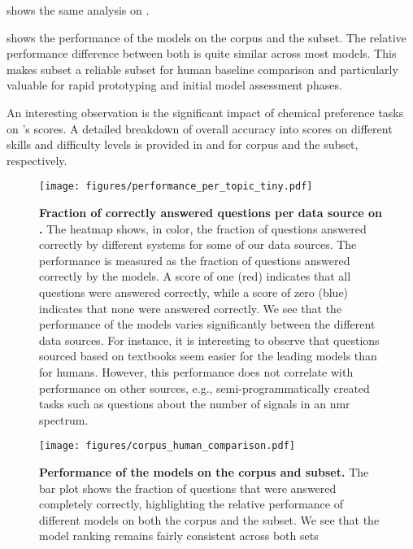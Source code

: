  shows the same analysis on \chembenchmini.

 shows the performance of the models on the \chembench corpus and the \chembenchmini subset. The relative performance difference between both is quite similar across most models. 
This makes \chembenchmini subset a reliable subset for human baseline comparison and particularly valuable for rapid prototyping and initial model assessment phases. 

An interesting observation is the significant impact of chemical preference tasks on \GPTFour's scores. A detailed breakdown of overall accuracy into scores on different skills and difficulty levels is provided in  and  for \chembench corpus and the \chembenchmini subset, respectively.


\begin{figure}[htb]
    \centering
    \texttt{[image: figures/performance\_per\_topic\_tiny.pdf]}
    \caption{\textbf{Fraction of correctly answered questions per data source on \chembenchmini.} The heatmap shows, in color, the fraction of questions answered correctly by different systems for some of our data sources. The performance is measured as the fraction of questions answered correctly by the models. A score of one (red) indicates that all questions were answered correctly, while a score of zero (blue) indicates that none were answered correctly.
        We see that the performance of the models varies significantly between the different data sources. For instance, it is interesting to observe that questions sourced based on textbooks seem easier for the leading models than for humans. However, this performance does not correlate with performance on other sources, e.g., semi-programmatically created tasks such as questions about the number of signals in an \gls{nmr} spectrum.
    }
    \label{fig:performance_per_topic_tiny}
\end{figure}


\begin{figure}[htb]
    \centering
    \texttt{[image: figures/corpus\_human\_comparison.pdf]}
    \caption{\textbf{
        Performance of the models on the \chembench corpus and \chembenchmini subset.} The bar plot shows the fraction of questions that were answered completely correctly, highlighting the relative performance of different models on both the \chembench corpus and the \chembenchmini subset.
        We see that the model ranking remains fairly consistent across both sets}  
    \label{fig:performance_corpus_and_tiny}
\end{figure}

